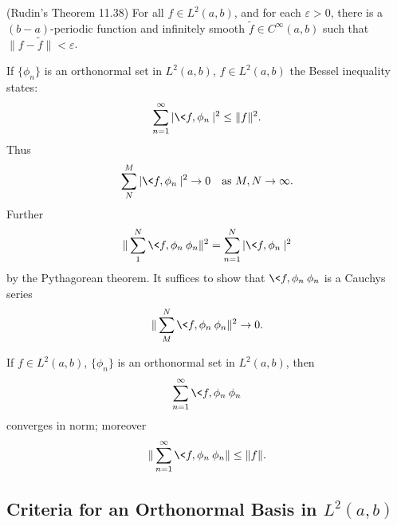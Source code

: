\begin{thm}{(Rudin's Theorem 11.38)}
For all $f\in L^{2}(a,b)$, and for each $\varepsilon>0$,
there is a $(b-a)$-periodic function and infinitely smooth
$\widetilde{f}\in C^{\infty}(a,b)$ such that
$\|f-\widetilde{f}\|<\varepsilon$.
\end{thm}

\begin{thm}
If $\{\phi_n\}$ is an orthonormal set in $L^{2}(a,b)$, $f\in
L^{2}(a,b)$ the Bessel inequality states: 
\begin{equation}
\sum^{\infty}_{n=1}|\<f,\phi_n\>|^2\leq\|f\|^2.
\end{equation} 
Thus
\begin{equation}
\sum^{M}_{N}|\<f,\phi_n\>|^2\to 0\quad\text{as }M,N\to\infty. 
\end{equation}
Further 
\begin{equation}
\|\sum^{N}_1 \<f,\phi_n\>\phi_n\|^2=\sum^{N}_{n=1}|\<f,\phi_n\>|^2
\end{equation}
by the Pythagorean theorem. It suffices to show that
$\<f,\phi_n\>\phi_n$ is a Cauchys series
\begin{equation}
\|\sum^{N}_{M}\<f,\phi_n\>\phi_n\|^2\to 0.
\end{equation}
\end{thm}

\begin{lem}
If $f\in L^{2}(a,b)$, $\{\phi_{n}\}$ is an orthonormal set
in $L^{2}(a,b)$, then
\begin{equation}
\sum^{\infty}_{n=1}\<f,\phi_n\>\phi_n
\end{equation}
converges in norm; moreover
\begin{equation}
\|\sum^{\infty}_{n=1}\<f,\phi_n\>\phi_n\|\leq\|f\|.
\end{equation}
\end{lem}

\subsection{Criteria for an Orthonormal Basis in $L^{2}(a,b)$}

